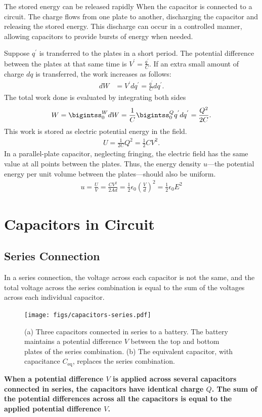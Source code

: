 \documentclass[12pt,b4paper]{article}
\begin{document}
The stored energy can be released rapidly When the capacitor is connected to a circuit. The charge flows from one plate to another, discharging the capacitor and releasing the stored energy. This discharge can occur in a controlled manner, allowing capacitors to provide bursts of energy when needed.

Suppose $q^{'}$ is transferred to the plates in a short period. The potential difference between the plates at that same time is $\displaystyle V^{'}=\frac{q^{'}}{C}$. If an extra small amount of charge $dq$ is transferred, the work increases as follows: 
\begin{align}
    dW&=V^{'}dq^{'}=\frac{q^{'}}{C}dq^{'}.
\end{align}
The total work done is evaluated by integrating both sides
\begin{align}
    W=\bigintss_{0}^{W} dW=\frac{1}{C}\bigintss_{0}^{Q} q^{'}dq^{'}=\frac{Q^2}{2C}.
\end{align}
This work is stored as electric potential energy in the field.
\begin{align}
    U=\frac{1}{2C}Q^2=\frac{1}{2}CV^2.
\end{align}
In a parallel-plate capacitor, neglecting fringing, the electric field has the same value at all points between the plates. Thus, the energy density $u$—the potential energy per unit volume between the plates—should also be uniform.
\begin{align}
    u=\frac{U}{V}=\frac{CV^2}{2Ad}=\frac{1}{2}\epsilon_0\left(\frac{V}{d}\right)^2=\frac{1}{2}\epsilon_0E^2
\end{align}
\section{Capacitors in Circuit}
\subsection{Series Connection}
In a series connection, the voltage across each capacitor is not the same, and the total voltage across the series combination is equal to the sum of the voltages across each individual capacitor.
\begin{figure}[H]
    \centering
    \texttt{[image: figs/capacitors-series.pdf]}
    \caption{(a) Three capacitors connected in series to a battery. The battery maintains a potential difference $V$ between the top and bottom plates of the series combination. (b) The equivalent capacitor, with capacitance $C_\text{eq}$, replaces the series combination.}
    \label{fig:capacitance-series}
\end{figure}
\textbf{When a potential difference $V$ is applied across several capacitors connected in series, the capacitors have identical charge $Q$. The sum of the potential differences across all the capacitors is equal to the applied potential difference $V$.}
\end{document}
